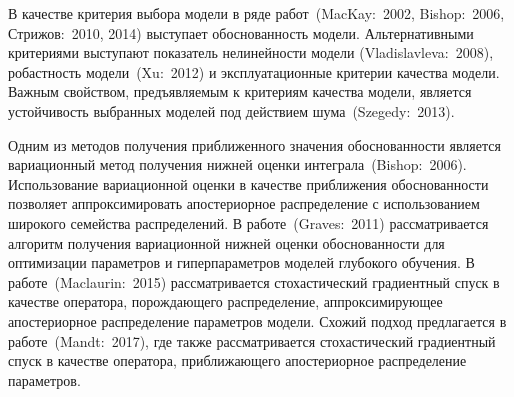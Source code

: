 \documentclass[11pt, a5paper]{dissert}
\theoremstyle{definition}
\begin{document}
В качестве критерия выбора модели в ряде работ~(MacKay:~2002, Bishop:~2006, Стрижов:~2010, 2014) выступает обоснованность модели. %
Альтернативными критериями выступают показатель нелинейности модели (Vladislavleva:~2008), робастность модели~(Xu:~2012) и эксплуатационные критерии качества модели. Важным свойством, предъявляемым к критериям качества модели, является устойчивость выбранных моделей под действием шума~(Szegedy:~2013). 

Одним из методов получения приближенного значения обоснованности является вариационный метод получения нижней оценки интеграла~(Bishop:~2006). Использование вариационной оценки в качестве приближения обоснованности позволяет аппроксимировать апостериорное распределение с использованием широкого семейства распределений.  В работе~(Graves:~2011) рассматривается алгоритм получения вариационной нижней оценки обоснованности  для оптимизации параметров и гиперпараметров моделей глубокого обучения. В работе~(Maclaurin:~2015) рассматривается стохастический градиентный спуск в качестве оператора, порождающего распределение, аппроксимирующее апостериорное распределение параметров модели. Схожий подход предлагается в работе~(Mandt:~2017), где также рассматривается стохастический градиентный спуск в качестве оператора, приближающего апостериорное распределение параметров. %

\end{document}
